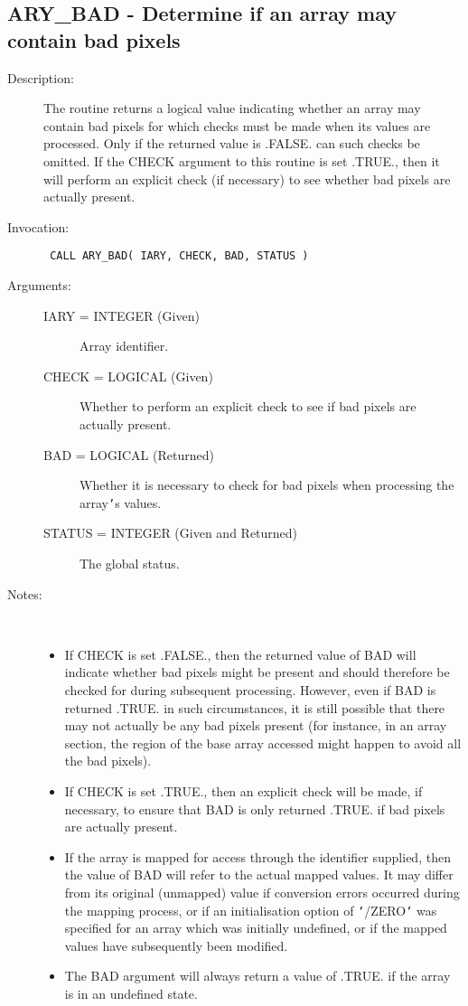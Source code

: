 \documentclass[twoside,11pt]{article}
\newcommand{\xlabel}[1]{}
\newlength{\sstbannerlength}
\newlength{\sstcaptionlength}
\newlength{\sstexampleslength}
\newlength{\sstexampleswidth}
\newcommand{\sstroutine}[3]{
   \goodbreak
   \rule{\textwidth}{0.5mm}
   \vspace{-7ex}
   \newline
   \settowidth{\sstbannerlength}{{\Large {\bf #1}}}
   \setlength{\sstcaptionlength}{\textwidth}
   \setlength{\sstexampleslength}{\textwidth}
   \addtolength{\sstbannerlength}{0.5em}
   \addtolength{\sstcaptionlength}{-2.0\sstbannerlength}
   \addtolength{\sstcaptionlength}{-5.0pt}
   \settowidth{\sstexampleswidth}{{\bf Examples:}}
   \addtolength{\sstexampleslength}{-\sstexampleswidth}
   \parbox[t]{\sstbannerlength}{\flushleft{\Large {\bf #1}}}
   \parbox[t]{\sstcaptionlength}{\center{\Large #2}}
   \parbox[t]{\sstbannerlength}{\flushright{\Large {\bf #1}}}
   \begin{description}
      #3
   \end{description}
}
\newcommand{\sstdescription}[1]{\item[Description:] #1}
\newcommand{\sstinvocation}[1]{\item[Invocation:]\hspace{0.4em}{\tt #1}}
\newcommand{\sstarguments}[1]{
   \item[Arguments:] \mbox{} \\
   \vspace{-3.5ex}
   \begin{description}
      #1
   \end{description}
}
\newcommand{\sstsubsection}[1]{ \item[{#1}] \mbox{} \\}
\newcommand{\sstnotes}[1]{\item[Notes:] \mbox{} \\[1.3ex] #1}
\newcommand{\sstitemlist}[1]{
  \mbox{} \\
  \vspace{-3.5ex}
  \begin{itemize}
     #1
  \end{itemize}
}
\newcommand{\sstitem}{\item}
\newcommand{\ssttt}{\tt}
\renewcommand{\sstroutine}[3]{
      \subsection{#1\xlabel{#1}-\label{#1}#2}
      \begin{description}
         #3
      \end{description}
   }
\renewcommand{\sstdescription}[1]{\item[Description:]
      \begin{description}
         #1
      \end{description}
   }
\renewcommand{\sstinvocation}[1]{\item[Invocation:]
      \begin{description}
         {\ssttt #1}
      \end{description}
   }
\renewcommand{\sstarguments}[1]{
      \item[Arguments:]
      \begin{description}
         #1
      \end{description}
   }
\renewcommand{\sstsubsection}[1]{\item[{#1}]}
\renewcommand{\sstnotes}[1]{\item[Notes:]
      \begin{description}
         #1
      \end{description}
   }
\newcommand{\sstitemlist}[1]{
      \begin{itemize}
         #1
      \end{itemize}
   }
\begin{document}
\sstroutine{
   ARY\_BAD
}{
   Determine if an array may contain bad pixels
}{
   \sstdescription{
      The routine returns a logical value indicating whether an array
      may contain bad pixels for which checks must be made when its
      values are processed. Only if the returned value is .FALSE. can
      such checks be omitted.  If the CHECK argument to this routine is
      set .TRUE., then it will perform an explicit check (if necessary)
      to see whether bad pixels are actually present.
   }
   \sstinvocation{
      CALL ARY\_BAD( IARY, CHECK, BAD, STATUS )
   }
   \sstarguments{
      \sstsubsection{
         IARY = INTEGER (Given)
      }{
         Array identifier.
      }
      \sstsubsection{
         CHECK = LOGICAL (Given)
      }{
         Whether to perform an explicit check to see if bad pixels are
         actually present.
      }
      \sstsubsection{
         BAD = LOGICAL (Returned)
      }{
         Whether it is necessary to check for bad pixels when processing
         the array{\tt '}s values.
      }
      \sstsubsection{
         STATUS = INTEGER (Given and Returned)
      }{
         The global status.
      }
   }
   \sstnotes{
      \sstitemlist{

         \sstitem
         If CHECK is set .FALSE., then the returned value of BAD will
         indicate whether bad pixels might be present and should therefore
         be checked for during subsequent processing. However, even if BAD
         is returned .TRUE. in such circumstances, it is still possible
         that there may not actually be any bad pixels present (for
         instance, in an array section, the region of the base array
         accessed might happen to avoid all the bad pixels).

         \sstitem
         If CHECK is set .TRUE., then an explicit check will be made,
         if necessary, to ensure that BAD is only returned .TRUE. if bad
         pixels are actually present.

         \sstitem
         If the array is mapped for access through the identifier
         supplied, then the value of BAD will refer to the actual mapped
         values. It may differ from its original (unmapped) value if
         conversion errors occurred during the mapping process, or if an
         initialisation option of {\tt '}/ZERO{\tt '} was specified for an array which
         was initially undefined, or if the mapped values have subsequently
         been modified.

         \sstitem
         The BAD argument will always return a value of .TRUE. if the
         array is in an undefined state.
      }
   }
}
\end{document}
